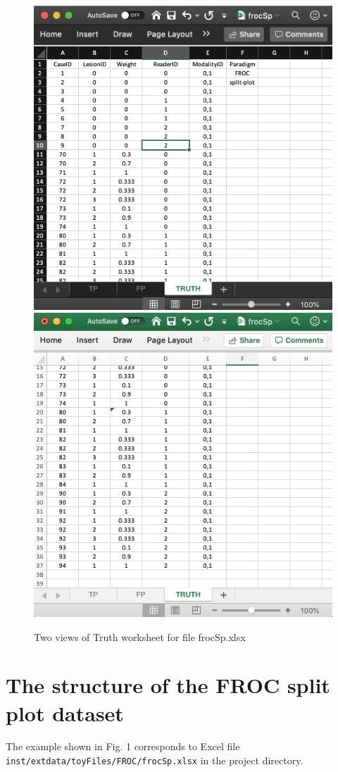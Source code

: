 \documentclass[]{book}
\begin{document}
\begin{figure}

{\centering \includegraphics[width=0.5\linewidth,height=0.2\textheight]{images/frocSpTruth} \includegraphics[width=0.5\linewidth,height=0.2\textheight]{images/frocSpTruth2} 

}

\caption{Two views of Truth worksheet for file frocSp.xlsx}\label{fig:frocSpTruth2}
\end{figure}

\hypertarget{the-structure-of-the-froc-split-plot-dataset}{%
\section{The structure of the FROC split plot dataset}\label{the-structure-of-the-froc-split-plot-dataset}}

The example shown in Fig. 1 corresponds to Excel file \texttt{inst/extdata/toyFiles/FROC/frocSp.xlsx} in the project directory.
\end{document}
